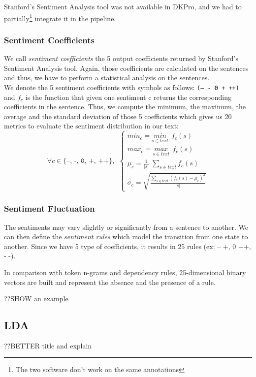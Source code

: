 Stanford's Sentiment Analysis tool was not available in DKPro, and we had to partially\footnote{The two software don't work on the same annotations} integrate it in the pipeline.

\subsubsection{Sentiment Coefficients}
We call \emph{sentiment coefficients} the 5 output coefficients returned by Stanford's Sentiment Analysis tool. Again, those coefficients are calculated on the sentences and thus, we have to perform a statistical analysis on the sentences. 
\\
We denote the 5 sentiment coefficients with symbols as follows: \texttt{(-- - 0 + ++)} and $f_{c}$ is the function that given one sentiment c returns the corresponding coefficients in the sentence. Thus, we compute the minimum, the maximum, the average and the standard deviation of those 5 coefficients which gives us 20 metrics to evaluate the sentiment distribution in our text:
\begin{equation*}
\forall c \in \texttt{\{--, -, 0, +, ++\}}, \: \:
\begin{cases}
min_c = \underset{s \in text}{min} \: \: f_c(s) \\
max_c = \underset{s \in text}{max} \: \: f_c(s) \\
\mu_c = \frac{1}{|s|} \; \displaystyle\sum_{s \in text} f_c(s) \\
\sigma_c = \sqrt{\frac{\displaystyle\sum_{s \in text} (f_c(s) - \mu_c)^2}{|s|}}
\end{cases}
\end{equation*} 

\subsubsection{Sentiment Fluctuation}
The sentiments may vary slightly or significantly from a sentence to another. We can then define the \emph{sentiment rules} which model the transition from one state to another. Since we have 5 type of coefficients, it results in 25 rules (ex: -- \rightarrow +, 0 \rightarrow ++, - \rightarrow -). 

In comparison with token n-grams and dependency rules, 25-dimensional binary vectors are built and represent the absence and the presence of a rule.

??SHOW an example

\subsection{LDA}
??BETTER title and explain

